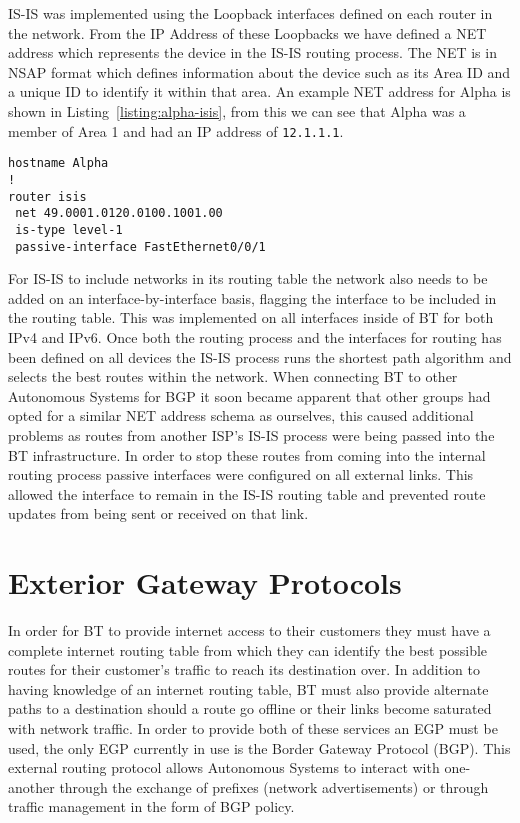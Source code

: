 IS-IS was implemented using the Loopback interfaces defined on each router in
the network. From the IP Address of these Loopbacks we have defined a NET
address which represents the device in the IS-IS routing process. The NET is in
NSAP format which defines information about the device such as its Area ID and
a unique ID to identify it within that area. An example NET address for
Alpha is shown in Listing~\ref{listing:alpha-isis}, from this we can see that
Alpha was a member of Area 1 and had an IP address of \texttt{12.1.1.1}.

\begin{lstlisting}[caption={Alpha IS-IS Configuration}, label={listing:alpha-isis}]
hostname Alpha
!
router isis
 net 49.0001.0120.0100.1001.00
 is-type level-1
 passive-interface FastEthernet0/0/1
\end{lstlisting}

For IS-IS to include networks in its routing table the network also needs to be
added on an interface-by-interface basis, flagging the interface to be included
in the routing table. This was implemented on all interfaces inside of BT for
both IPv4 and IPv6. Once both the routing process and the interfaces for
routing has been defined on all devices the IS-IS process runs the shortest
path algorithm and selects the best routes within the network. When connecting
BT to other Autonomous Systems for BGP it soon became apparent that other
groups had opted for a similar NET address schema as ourselves, this caused
additional problems as routes from another ISP's IS-IS process were being
passed into the BT infrastructure. In order to stop these routes from coming
into the internal routing process passive interfaces were configured on all
external links. This allowed the interface to remain in the IS-IS routing table
and prevented route updates from being sent or received on that link.

\section{Exterior Gateway Protocols}
In order for BT to provide internet access to their customers they must have a
complete internet routing table from which they can identify the best possible
routes for their customer's traffic to reach its destination over. In addition
to having knowledge of an internet routing table, BT must also provide
alternate paths to a destination should a route go offline or their links
become saturated with network traffic. In order to provide both of these
services an EGP must be used, the only EGP currently in use is the Border
Gateway Protocol (BGP). This external routing protocol allows Autonomous
Systems to interact with one-another through the exchange of prefixes (network
advertisements) or through traffic management in the form of BGP policy.

